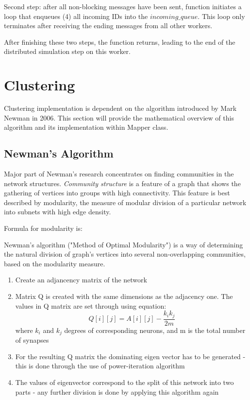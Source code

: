 Second step: after all non-blocking messages have been sent, function initiates a loop that enqueues (4) all incoming IDs into the $incoming\_queue$. This loop only terminates after receiving the ending messages from all other workers.

After finishing these two steps, the function returns, leading to the end of the distributed simulation step on this worker.

\section{Clustering}

Clustering implementation is dependent on the algorithm introduced by Mark Newman in 2006. This section will provide the mathematical overview of this algorithm and its implementation within Mapper class.

\subsection{Newman's Algorithm}

Major part of Newman's research concentrates on finding communities in the network structures\cite{NewmanComm}. \emph{Community structure} is a feature of a graph that shows the gathering of vertices into groups with high connectivity. This feature is best described by modularity, the measure of modular division of a particular network into subnets with high edge density.

Formula for modularity is:
\begin{equation}\end{equation}

Newman's algorithm ("Method of Optimal Modularity"\cite{Newman2006}) is a way of determining the natural division of graph's vertices into several non-overlapping communities, based on the modularity measure. 

\begin{enumerate}
\item{Create an adjancency matrix of the network}
\item{Matrix Q is created with the same dimensions as the adjacency one. The values in Q matrix are set through using equation: 
\begin{equation}Q[i][j] = A[i][j] - \frac{k_{i}k_{j}}{2m}\end{equation}
where $k_{i}$ and $k_{j}$ degrees of corresponding neurons, and m is the total number of synapses}
\item{For the resulting Q matrix the dominating eigen vector has to be generated - this is done through the use of power-iteration algorithm}
\item{The values of eigenvector correspond to the split of this network into two parts - any further division is done by applying this algorithm again}
\end{enumerate}

